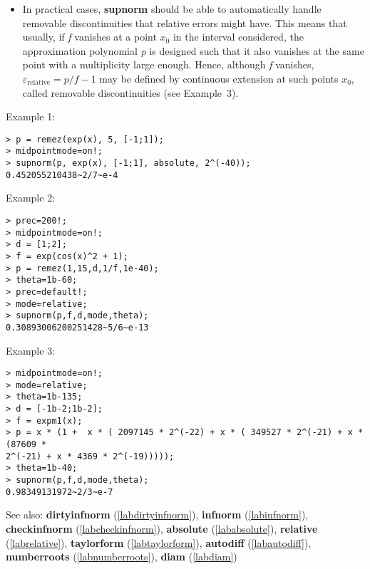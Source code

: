 \begin{itemize}
\item In practical cases, \textbf{supnorm} should be able to automatically handle
   removable discontinuities that relative errors might have. This means
   that usually, if \emph{f} vanishes at a point $x_0$ in the interval
   considered, the approximation polynomial \emph{p} is designed such that it
   also vanishes at the same point with a multiplicity large
   enough. Hence, although \emph{f} vanishes, $\varepsilon_{\textrm{relative}}=p/f-1$ may be 
   defined by continuous extension at such points $x_0$, called 
   removable discontinuities (see Example~$3$).
\end{itemize}
\noindent Example 1: 
\begin{center}\begin{minipage}{15cm}\begin{Verbatim}[frame=single]
> p = remez(exp(x), 5, [-1;1]);
> midpointmode=on!;
> supnorm(p, exp(x), [-1;1], absolute, 2^(-40));
0.452055210438~2/7~e-4
\end{Verbatim}
\end{minipage}\end{center}
\noindent Example 2: 
\begin{center}\begin{minipage}{15cm}\begin{Verbatim}[frame=single]
> prec=200!;
> midpointmode=on!;
> d = [1;2];
> f = exp(cos(x)^2 + 1);
> p = remez(1,15,d,1/f,1e-40);
> theta=1b-60;
> prec=default!;
> mode=relative;
> supnorm(p,f,d,mode,theta);
0.30893006200251428~5/6~e-13
\end{Verbatim}
\end{minipage}\end{center}
\noindent Example 3: 
\begin{center}\begin{minipage}{15cm}\begin{Verbatim}[frame=single]
> midpointmode=on!;
> mode=relative;
> theta=1b-135;
> d = [-1b-2;1b-2];
> f = expm1(x);
> p = x * (1 +  x * ( 2097145 * 2^(-22) + x * ( 349527 * 2^(-21) + x * (87609 * 
2^(-21) + x * 4369 * 2^(-19))))); 
> theta=1b-40;
> supnorm(p,f,d,mode,theta);
0.98349131972~2/3~e-7
\end{Verbatim}
\end{minipage}\end{center}
See also: \textbf{dirtyinfnorm} (\ref{labdirtyinfnorm}), \textbf{infnorm} (\ref{labinfnorm}), \textbf{checkinfnorm} (\ref{labcheckinfnorm}), \textbf{absolute} (\ref{lababsolute}), \textbf{relative} (\ref{labrelative}), \textbf{taylorform} (\ref{labtaylorform}), \textbf{autodiff} (\ref{labautodiff}), \textbf{numberroots} (\ref{labnumberroots}), \textbf{diam} (\ref{labdiam})
